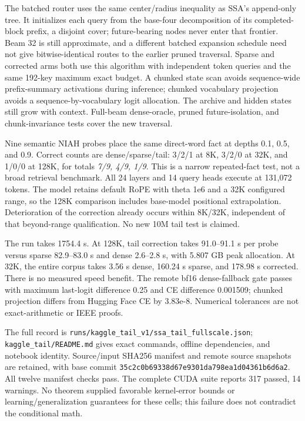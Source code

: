 \documentclass[11pt]{article}
\numberwithin{equation}{section}
\begin{document}
The batched router uses the same center/radius inequality as SSA's append-only tree. It initializes each
query from the base-four decomposition of its completed-block prefix, a disjoint cover; future-bearing
nodes never enter that frontier. Beam 32 is still approximate, and a different batched expansion schedule
need not give bitwise-identical routes to the earlier pruned traversal. Sparse and corrected arms both
use this algorithm with independent token queries and the same 192-key maximum exact budget. A chunked
state scan avoids sequence-wide prefix-summary activations during inference; chunked vocabulary projection
avoids a sequence-by-vocabulary logit allocation. The archive and hidden states still grow with context.
Full-beam dense-oracle, pruned future-isolation, and chunk-invariance tests cover the new traversal.

Nine semantic NIAH probes place the same direct-word fact at depths 0.1, 0.5, and 0.9. Correct counts are
dense/sparse/tail: 3/2/1 at 8K, 3/2/0 at 32K, and 1/0/0 at 128K, for totals \emph{7/9, 4/9, 1/9}. This is a
narrow repeated-fact test, not a broad retrieval benchmark. All 24 layers and 14 query heads execute at
131,072 tokens. The model retains default RoPE with theta 1e6 and a 32K configured range, so the 128K
comparison includes base-model positional extrapolation. Deterioration of the correction already occurs
within 8K/32K, independent of that beyond-range qualification. No new 10M tail test is claimed.

The run takes 1754.4 s. At 128K, tail correction takes 91.0--91.1 s per probe versus sparse 82.9--83.0 s
and dense 2.6--2.8 s, with 5.807 GB peak allocation. At 32K, the entire corpus takes 3.56 s dense, 160.24 s
sparse, and 178.98 s corrected. There is no measured speed benefit. The remote bf16 dense-fallback gate
passes with maximum last-logit difference 0.25 and CE difference 0.001509; chunked projection differs from
Hugging Face CE by 3.83e-8. Numerical tolerances are not exact-arithmetic or IEEE proofs.

The full record is \texttt{runs/kaggle\_tail\_v1/ssa\_tail\_fullscale.json};
\texttt{kaggle\_tail/README.md} gives exact commands, offline dependencies, and notebook identity. Source/input
SHA256 manifest and remote source snapshots are retained, with base commit
\texttt{35c2c0b69338d67e9301da798ea1d04361b6d6a2}. All twelve manifest checks pass. The complete CUDA suite
reports 317 passed, 14 warnings. No theorem supplied favorable kernel-error bounds or learning/generalization
guarantees for these cells; this failure does not contradict the conditional math.
\end{document}

